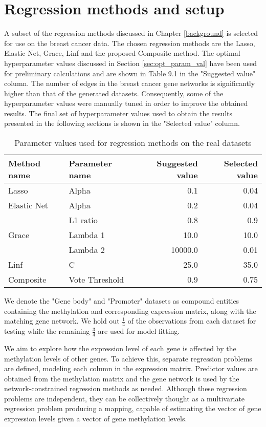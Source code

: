 \section{Regression methods and setup}
A subset of the regression methods discussed in Chapter \ref{background} is selected for use on the breast cancer data. The chosen regression methods are the Lasso, Elastic Net, Grace, Linf and the proposed Composite method.
The optimal hyperparameter values discussed in Section \ref{sec:opt_param_val} have been used for preliminary calculations and are shown in Table 
9.1 %
in the "Suggested value" column. The number of edges in the breast cancer gene networks is significantly higher than that of the generated datasets. Consequently, some of the hyperparameter values were manually tuned in order to improve the obtained results. The final set of hyperparameter values used to obtain the results presented in the following sections is shown in the "Selected value" column.

{\def\arraystretch{1.5}\tabcolsep=10pt
	\begin{table}[H]
		\label{tab:plswork}
		\caption{Parameter values used for regression methods on the real datasets}
		\centering
		\begin{tabular}{l l r r}
			\hline\hline 
			Method name & Parameter name & Suggested value & Selected value\\
			\hline\hline
			Lasso	&	Alpha	&	0.1	&	0.04\\
			\hline
			Elastic Net	&	Alpha	&	0.2	&	0.04\\
						&	L1 ratio&	0.8	&	0.9\\
			\hline
			Grace	&	Lambda 1	&	10.0	&	10.0\\
					&	Lambda 2	&	10000.0	&	0.01\\
			\hline
			Linf	&	C	&	25.0	&	35.0\\
			\hline
			Composite	&	Vote Threshold	&	0.9	&	0.75\\
			\hline
		\end{tabular}
	\end{table}
}

We denote the "Gene body" and "Promoter" datasets as compound entities containing the methylation and corresponding expression matrix, along with the matching gene network. We hold out $\frac{1}{4}$ of the observations from each dataset for testing while the remaining $\frac{3}{4}$ are used for model fitting.

We aim to explore how the expression level of each gene is affected by the methylation levels of other genes. To achieve this, separate regression problems are defined, modeling each column in the expression matrix. Predictor values are obtained from the methylation matrix and the gene network is used by the network-constrained regression methods as needed. Although these regression problems are independent, they can be collectively thought as a multivariate regression problem producing a mapping, capable of estimating the vector of gene expression levels given a vector of gene methylation levels.


